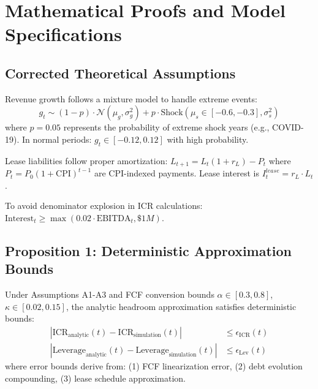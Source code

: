 
\appendix
\section{Mathematical Proofs and Model Specifications}

\subsection{Corrected Theoretical Assumptions}

\begin{assumption}
Revenue growth follows a mixture model to handle extreme events:
$$g_t \sim (1-p) \cdot \mathcal{N}(\mu_g, \sigma_g^2) + p \cdot \text{Shock}(\mu_s \in [-0.6, -0.3], \sigma_s^2)$$
where $p = 0.05$ represents the probability of extreme shock years (e.g., COVID-19).
In normal periods: $g_t \in [-0.12, 0.12]$ with high probability.
\end{assumption}

\begin{assumption}
Lease liabilities follow proper amortization: $L_{t+1} = L_t(1 + r_L) - P_t$ where $P_t = P_0(1 + \text{CPI})^{t-1}$ are CPI-indexed payments. Lease interest is $I_t^{lease} = r_L \cdot L_t$.
\end{assumption}

\begin{assumption}
To avoid denominator explosion in ICR calculations: $\text{Interest}_t \geq \max(0.02 \cdot \text{EBITDA}_t, \$1M)$.
\end{assumption}

\subsection{Proposition 1: Deterministic Approximation Bounds}

\begin{proposition}
Under Assumptions A1-A3 and FCF conversion bounds $\alpha \in [0.3, 0.8]$, $\kappa \in [0.02, 0.15]$, 
the analytic headroom approximation satisfies deterministic bounds:
\begin{align}
|\text{ICR}_{\text{analytic}}(t) - \text{ICR}_{\text{simulation}}(t)| &\leq \epsilon_{\text{ICR}}(t) \\
|\text{Leverage}_{\text{analytic}}(t) - \text{Leverage}_{\text{simulation}}(t)| &\leq \epsilon_{\text{Lev}}(t)
\end{align}
where error bounds derive from: (1) FCF linearization error, (2) debt evolution compounding, (3) lease schedule approximation.
\end{proposition}


